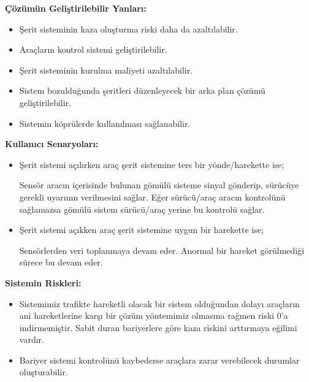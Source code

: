 \documentclass[12pt,a4paper]{report}
\begin{document}
\newpage
{\large\bfseries Çözümün Geliştirilebilir Yanları: \par}

\begin{itemize}
	\item Şerit sisteminin kaza oluşturma riski daha da azaltılabilir.
	
	\item Araçların kontrol sistemi geliştirilebilir.
	
	\item Şerit sisteminin kurulma maliyeti azaltılabilir.
	
	\item Sistem bozulduğunda şeritleri düzenleyecek bir arka plan çözümü geliştirilebilir.
	
	\item Sistemin köprülerde kullanılması sağlanabilir.
\end{itemize}

{\large\bfseries Kullanıcı Senaryoları: \par}

\begin{itemize}
	\item Şerit sistemi açılırken araç şerit sistemine ters bir yönde/harekette ise;
	
	Sensör aracın içerisinde bulunan gömülü sisteme sinyal gönderip, sürücüye gerekli uyarının verilmesini sağlar. Eğer sürücü/araç aracın kontrolünü sağlamazsa gömülü sistem sürücü/araç yerine bu kontrolü sağlar.
	
	\item Şerit sistemi açıkken araç şerit sistemine uygun bir harekette ise;
	
	Sensörlerden veri toplanmaya devam eder. Anormal bir hareket görülmediği sürece bu devam eder.
\end{itemize}

{\large\bfseries Sistemin Riskleri: \par}

\begin{itemize}
	\item Sistemimiz trafikte hareketli olacak bir sistem olduğundan dolayı araçların ani hareketlerine karşı bir çözüm yöntemimiz olmasına rağmen riski 0’a indirmemiştir. Sabit duran bariyerlere göre kaza riskini arttırmaya eğilimi vardır.
	
	\item Bariyer sistemi kontrolünü kaybederse araçlara zarar verebilecek durumlar oluşturabilir.
\end{itemize}
\end{document}

